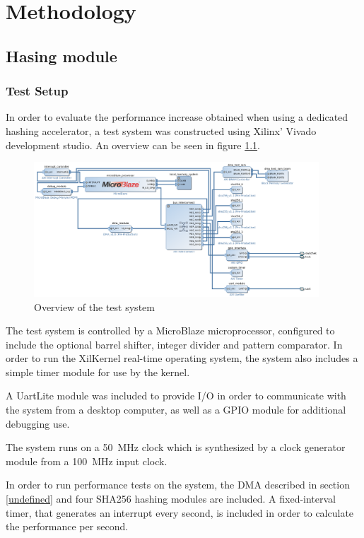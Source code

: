 \chapter{Methodology}

\section{Hasing module}

\subsection{Test Setup}
In order to evaluate the performance increase obtained when using a dedicated
hashing accelerator, a test system was constructed using Xilinx' Vivado
development studio. An overview can be seen in figure \ref{fig:testsystem-vivado}.

\begin{figure}[ht]
	\includegraphics[width=0.95\textwidth]{Figures/testsystem-vivado.png}
	\caption{Overview of the test system}
	\label{fig:testsystem-vivado}
\end{figure}

The test system is controlled by a MicroBlaze microprocessor, configured to
include the optional barrel shifter, integer divider and pattern comparator.
In order to run the XilKernel real-time operating system, the system also
includes a simple timer module for use by the kernel.

A UartLite module was included to provide I/O in order to communicate with
the system from a desktop computer, as well as a GPIO module for additional
debugging use.

The system runs on a 50~MHz clock which is synthesized by a clock generator
module from a 100~MHz input clock.

In order to run performance tests on the system, the DMA described in
section \ref{undefined} and four
SHA256 hashing modules are included.
A fixed-interval timer, that generates an interrupt every second, is
included in order to calculate the performance per second.

